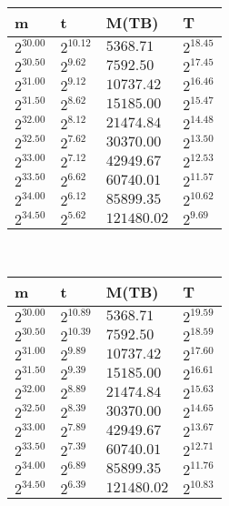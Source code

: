 \begin{tabular}{llll}
m & t & M(TB) & T \\ \hline
$2^{30.00}$ & $2^{10.12}$ & $5368.71$ & $2^{18.45}$ \\
$2^{30.50}$ & $2^{9.62}$ & $7592.50$ & $2^{17.45}$ \\
$2^{31.00}$ & $2^{9.12}$ & $10737.42$ & $2^{16.46}$ \\
$2^{31.50}$ & $2^{8.62}$ & $15185.00$ & $2^{15.47}$ \\
$2^{32.00}$ & $2^{8.12}$ & $21474.84$ & $2^{14.48}$ \\
$2^{32.50}$ & $2^{7.62}$ & $30370.00$ & $2^{13.50}$ \\
$2^{33.00}$ & $2^{7.12}$ & $42949.67$ & $2^{12.53}$ \\
$2^{33.50}$ & $2^{6.62}$ & $60740.01$ & $2^{11.57}$ \\
$2^{34.00}$ & $2^{6.12}$ & $85899.35$ & $2^{10.62}$ \\
$2^{34.50}$ & $2^{5.62}$ & $121480.02$ & $2^{9.69}$ \\
\end{tabular}
 \ 
\begin{tabular}{llll}
m & t & M(TB) & T \\ \hline
$2^{30.00}$ & $2^{10.89}$ & $5368.71$ & $2^{19.59}$ \\
$2^{30.50}$ & $2^{10.39}$ & $7592.50$ & $2^{18.59}$ \\
$2^{31.00}$ & $2^{9.89}$ & $10737.42$ & $2^{17.60}$ \\
$2^{31.50}$ & $2^{9.39}$ & $15185.00$ & $2^{16.61}$ \\
$2^{32.00}$ & $2^{8.89}$ & $21474.84$ & $2^{15.63}$ \\
$2^{32.50}$ & $2^{8.39}$ & $30370.00$ & $2^{14.65}$ \\
$2^{33.00}$ & $2^{7.89}$ & $42949.67$ & $2^{13.67}$ \\
$2^{33.50}$ & $2^{7.39}$ & $60740.01$ & $2^{12.71}$ \\
$2^{34.00}$ & $2^{6.89}$ & $85899.35$ & $2^{11.76}$ \\
$2^{34.50}$ & $2^{6.39}$ & $121480.02$ & $2^{10.83}$ \\
\end{tabular}
 \ 
